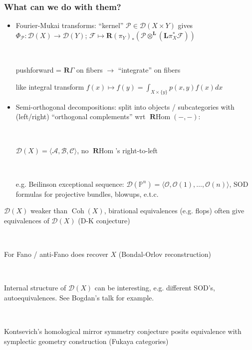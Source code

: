 \documentclass{beamer}
\DeclareMathOperator{\Coh}{Coh}
\renewcommand{\P}{\mathbb{P}}
\renewcommand{\O}{\mathcal{O}}
\newcommand{\calA}{\mathcal{A}}
\newcommand{\calB}{\mathcal{B}}
\newcommand{\calC}{\mathcal{C}}
\newcommand{\calD}{\mathcal{D}}
\newcommand{\calP}{\mathcal{P}}
\newcommand{\calF}{\mathcal{F}}
\newcommand{\dL}[1]{\mathbf{L}#1}
\newcommand{\dR}[1]{\mathbf{R}#1}
\DeclareMathOperator{\RHom}{\dR Hom}
\begin{document}
\begin{frame}
    \frametitle{What can we do with them?} \pause

    \begin{itemize}
        \item
            Fourier-Mukai transforms: \pause ``kernel''
            $\calP\in\calD(X\times Y)$ gives $\Phi_\calP:\calD(X)\to\calD(Y)$;
            $\calF\mapsto\dR(\pi_Y)_*(\calP\otimes^\dL(\dL\pi_X^*\calF))$ \pause


            ~

            pushforward = $\dR\Gamma$ on fibers $\to$ ``integrate'' on fibers

            like integral transform
            $f(x)\mapsto\hat f(y)=\int_{X\times\{y\}}p(x,y)f(x)dx$ \pause


        \item
            Semi-orthogonal decompositions: \pause split into objects /
            subcategories with (left/right) ``orthogonal complements'' wrt
            $\RHom(-,-)$: \pause

            ~

            $\calD(X)=\langle\calA,\calB,\calC\rangle$, no $\RHom$'s
            right-to-left \pause

            ~

            e.g. Beilinson exceptional sequence:
            $\calD(\P^n)=\langle\O,\O(1),\ldots,\O(n)\rangle$, SOD formulas for
            projective bundles, blowups, e.t.c.

    \end{itemize}
\end{frame}

\begin{frame}
    $\calD(X)$ weaker than $\Coh(X)$, birational equivalences (e.g. flops) often
    give equivalences of $\calD(X)$ (D-K conjecture) \pause

    ~

    For Fano / anti-Fano does recover $X$ (Bondal-Orlov reconstruction) \pause

    ~

    Internal structure of $\calD(X)$ can be interesting, e.g. different SOD's,
    autoequivalences. See Bogdan's talk for example. \pause

    ~

    Kontsevich's homological mirror symmetry conjecture posits equivalence with
    symplectic geometry construction (Fukaya categories)
\end{frame}
\end{document}
